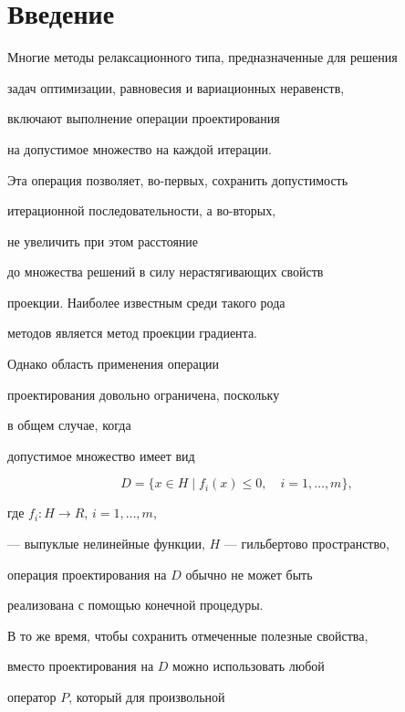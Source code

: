 \label{begin}





\section{Введение}





Многие методы релаксационного типа, предназначенные для решения


задач оптимизации, равновесия и вариационных неравенств,


включают выполнение операции проектирования


на допустимое множество на каждой итерации.


Эта операция позволяет, во-первых, сохранить допустимость


итерационной последовательности, а во-вторых,


не увеличить при этом расстояние


до множества решений в силу нерастягивающих свойств


проекции. Наиболее известным среди такого рода


методов является метод проекции градиента.


 Однако область применения операции


проектирования довольно ограничена, поскольку


в общем случае, когда


допустимое множество имеет вид


\begin{equation} \label{eq:1}


 D=\{ x \in H \mid f_{i}(x)\leq 0, \quad i=1,\ldots,m \},


\end{equation}


где $ f_{i}:H \rightarrow R$, $i=1,\dotsc,m$,


--- выпуклые нелинейные функции, $H$ --- гильбертово пространство,


 операция проектирования на $D$ обычно не может быть


реализована с помощью конечной процедуры.


В то же время, чтобы сохранить отмеченные полезные свойства,


вместо проектирования на $D$ можно использовать любой


оператор $P$, который для произвольной


